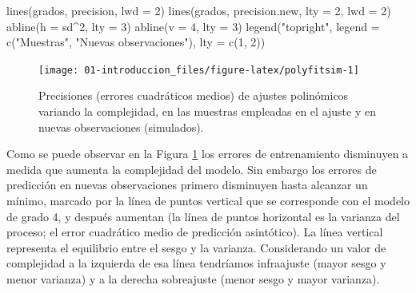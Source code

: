 \documentclass[
  spanish,
]{book}
\newenvironment{Shaded}{\begin{snugshade}}{\end{snugshade}}
\newcommand{\AttributeTok}[1]{\textcolor[rgb]{0.77,0.63,0.00}{#1}}
\newcommand{\DecValTok}[1]{\textcolor[rgb]{0.00,0.00,0.81}{#1}}
\newcommand{\FunctionTok}[1]{\textcolor[rgb]{0.00,0.00,0.00}{#1}}
\newcommand{\NormalTok}[1]{#1}
\newcommand{\SpecialCharTok}[1]{\textcolor[rgb]{0.00,0.00,0.00}{#1}}
\newcommand{\StringTok}[1]{\textcolor[rgb]{0.31,0.60,0.02}{#1}}
\theoremstyle{break}
\theoremstyle{definition}
\theoremstyle{definition}
\theoremstyle{definition}
\theoremstyle{definition}
\theoremstyle{remark}
\begin{document}
\begin{Shaded}
\begin{Highlighting}[]
\FunctionTok{lines}\NormalTok{(grados, precision, }\AttributeTok{lwd =} \DecValTok{2}\NormalTok{)}
\FunctionTok{lines}\NormalTok{(grados, precision.new, }\AttributeTok{lty =} \DecValTok{2}\NormalTok{, }\AttributeTok{lwd =} \DecValTok{2}\NormalTok{)}
\FunctionTok{abline}\NormalTok{(}\AttributeTok{h =}\NormalTok{ sd}\SpecialCharTok{\^{}}\DecValTok{2}\NormalTok{, }\AttributeTok{lty =} \DecValTok{3}\NormalTok{)}
\FunctionTok{abline}\NormalTok{(}\AttributeTok{v =} \DecValTok{4}\NormalTok{, }\AttributeTok{lty =} \DecValTok{3}\NormalTok{)}
\FunctionTok{legend}\NormalTok{(}\StringTok{"topright"}\NormalTok{, }\AttributeTok{legend =} \FunctionTok{c}\NormalTok{(}\StringTok{"Muestras"}\NormalTok{, }\StringTok{"Nuevas observaciones"}\NormalTok{), }\AttributeTok{lty =} \FunctionTok{c}\NormalTok{(}\DecValTok{1}\NormalTok{, }\DecValTok{2}\NormalTok{))}
\end{Highlighting}
\end{Shaded}

\begin{figure}[!htb]

{\centering \texttt{[image: 01-introduccion\_files/figure-latex/polyfitsim-1]} 

}

\caption{Precisiones (errores cuadráticos medios) de ajustes polinómicos variando la complejidad, en las muestras empleadas en el ajuste y en nuevas observaciones (simulados).}\label{fig:polyfitsim}
\end{figure}

Como se puede observar en la Figura \ref{fig:polyfitsim} los errores de entrenamiento disminuyen a medida que aumenta la complejidad del modelo.
Sin embargo los errores de predicción en nuevas observaciones primero disminuyen hasta alcanzar un mínimo, marcado por la línea de puntos vertical que se corresponde con el modelo de grado 4, y después aumentan (la línea de puntos horizontal es la varianza del proceso; el error cuadrático medio de predicción asintótico).
La línea vertical representa el equilibrio entre el sesgo y la varianza.
Considerando un valor de complejidad a la izquierda de esa línea tendríamos infraajuste (mayor sesgo y menor varianza) y a la derecha sobreajuste (menor sesgo y mayor varianza).
\end{document}
